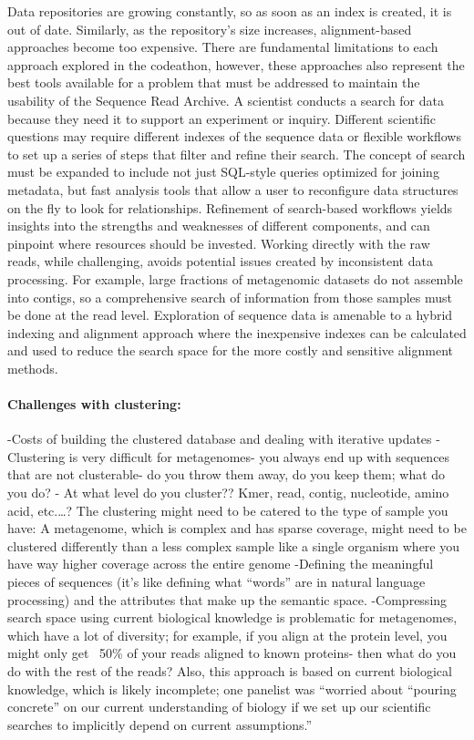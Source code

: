 Data repositories are growing constantly, so as soon as an index is created, it is out of date. Similarly, as the repository’s size increases, alignment-based approaches become too expensive. There are fundamental limitations to each approach explored in the codeathon, however, these approaches also represent the best tools available for a problem that must be addressed to maintain the usability of the Sequence Read Archive. 
A scientist conducts a search for data because they need it to support an experiment or inquiry. Different scientific questions may require different indexes of the sequence data or flexible workflows to set up a series of steps that filter and refine their search. The concept of search must be expanded to include not just SQL-style queries optimized for joining metadata, but fast analysis tools that allow a user to reconfigure data structures on the fly to look for relationships. Refinement of search-based workflows yields insights into the strengths and weaknesses of different components, and can pinpoint where resources should be invested. 
Working directly with the raw reads, while challenging, avoids potential issues created by inconsistent data processing. For example, large fractions of metagenomic datasets do not assemble into contigs, so a comprehensive search of information from those samples must be done at the read level. 
Exploration of sequence data is amenable to a hybrid indexing and alignment approach where the inexpensive indexes can be calculated and used to reduce the search space for the more costly and sensitive alignment methods. 

\paragraph{Challenges with clustering:}
-Costs of building the clustered database and dealing with iterative updates
- Clustering is very difficult for metagenomes- you always end up with sequences that are not clusterable- do you throw them away, do you keep them; what do you do?
- At what level do you cluster?? Kmer, read, contig, nucleotide, amino acid, etc.…?  The clustering might need to be catered to the type of sample you have: A metagenome, which is complex and has sparse coverage, might need to be clustered differently than a less complex sample like a single organism where you have way higher coverage across the entire genome
-Defining the meaningful pieces of sequences (it’s like defining what “words” are in natural language processing) and the attributes that make up the semantic space. 
-Compressing search space using current biological knowledge is problematic for metagenomes, which have a lot of diversity; for example, if you align at the protein level, you might only get ~50\% of your reads aligned to known proteins- then what do you do with the rest of the reads?  Also, this approach is based on current biological knowledge, which is likely incomplete; one panelist was “worried about “pouring concrete” on our current understanding of biology if we set up our scientific searches to implicitly depend on current assumptions.”
